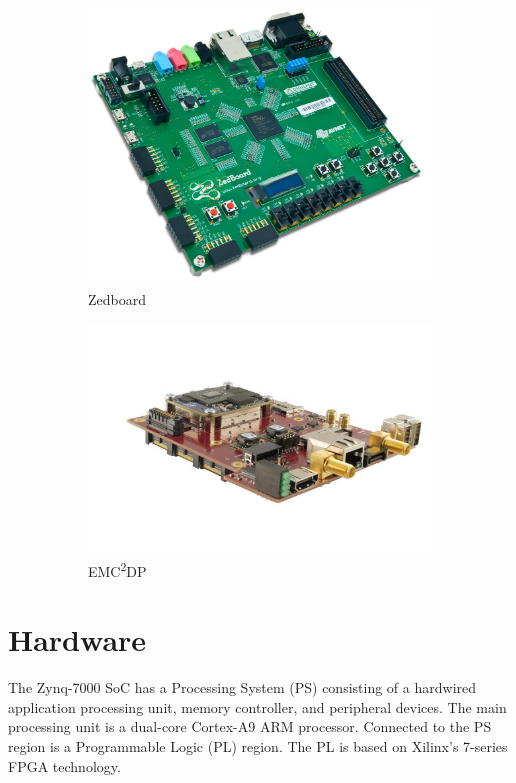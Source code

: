 \begin{figure}[H]
\centering
\begin{subfigure}[b]{0.3\textwidth}
\includegraphics[width=\textwidth]{./img/zedboard.jpg}
\caption{Zedboard}
\end{subfigure}
\begin{subfigure}[b]{0.3\textwidth}
\includegraphics[width=\textwidth]{./img/emc2dp.jpg}
\caption{EMC\textsuperscript{2}DP}
\end{subfigure}
\caption{}
\label{fig:development_boards}
\end{figure}

\section{Hardware}
The Zynq-7000 SoC has a Processing System (PS) consisting of a hardwired application processing unit, memory controller, and peripheral devices. The main processing unit is a dual-core Cortex-A9 ARM processor. Connected to the PS region is a Programmable Logic (PL) region. The PL is based on Xilinx's 7-series FPGA technology.\\

